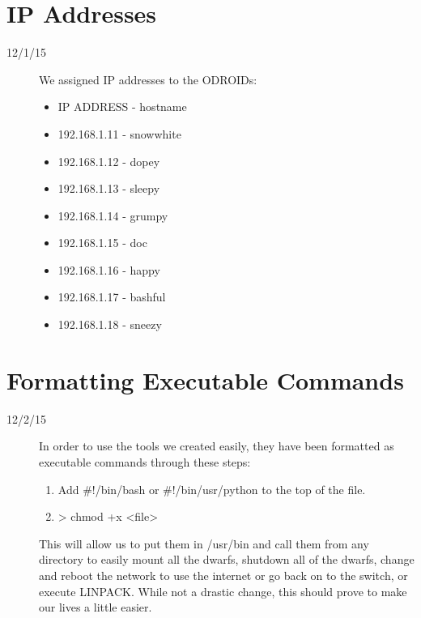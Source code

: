 \section{IP Addresses}
\begin{description}
\item [12/1/15] We assigned IP addresses to the ODROIDs:
\begin{itemize}
	\item IP ADDRESS - hostname
	\item 192.168.1.11 - snow\textunderscore white
	\item 192.168.1.12 - dopey
	\item 192.168.1.13 - sleepy
	\item 192.168.1.14 - grumpy
	\item 192.168.1.15 - doc
	\item 192.168.1.16 - happy
	\item 192.168.1.17 - bashful
	\item 192.168.1.18 - sneezy
\end{itemize}
\end{description}

\section{Formatting Executable Commands}
\begin{description}
\item [12/2/15] In order to use the tools we created easily, they have been formatted as executable commands through these steps:
\begin{enumerate}
	\item Add \#!/bin/bash or \#!/bin/usr/python to the top of the file.
	\item > chmod +x <file>
\end{enumerate}
This will allow us to put them in /usr/bin and call them from any directory to easily mount all the dwarfs, shutdown all of the dwarfs, change and reboot the network to use the internet or go back on to the switch, or execute LINPACK. While not a drastic change, this should prove to make our lives a little easier.
\end{description}

